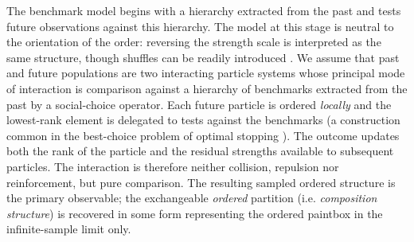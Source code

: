 \documentclass[11pt]{article}
\theoremstyle{plain}
\theoremstyle{definition}
\begin{document}

 

The benchmark model begins with a hierarchy extracted from the past and tests future observations against this hierarchy. 
The model at this stage is neutral to the orientation of the order: reversing the strength scale is interpreted as the same structure, though shuffles can be readily introduced \cite{gnedin2006coherent}.
We assume that past and future populations are two interacting particle systems whose principal mode of interaction is comparison against a hierarchy of benchmarks extracted from the past by a social-choice operator. Each future particle is ordered \emph{locally} and the lowest-rank element is delegated to tests against the benchmarks (a construction common in the best-choice problem of optimal stopping \cite{gnedin2026memoryless}). The outcome updates both the rank of the particle and the residual strengths available to subsequent particles. The interaction is therefore neither collision, repulsion nor reinforcement, but pure comparison. The resulting sampled ordered structure is the primary observable; the exchangeable  {\it ordered}  partition (i.e. {\it composition structure})  is recovered in some form representing the ordered paintbox 
in the infinite-sample limit only.










\end{document}

